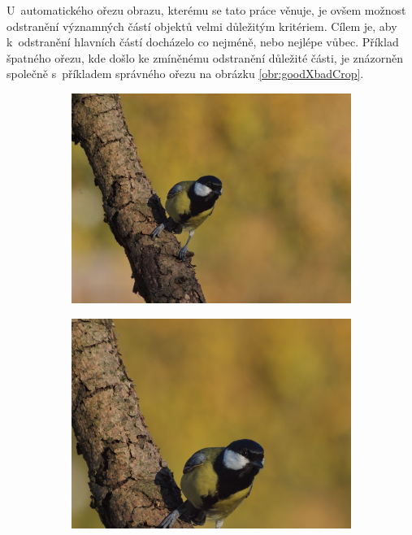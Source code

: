 U~automatického ořezu obrazu, kterému se tato práce věnuje, je ovšem možnost odstranění významných částí objektů velmi důležitým kritériem. Cílem je, aby k~odstranění hlavních částí docházelo co nejméně, nebo nejlépe vůbec. Příklad špatného ořezu, kde došlo ke zmíněnému odstranění důležité části, je znázorněn společně s~příkladem správného ořezu na obrázku \ref{obr:goodXbadCrop}.

\begin{figure}[H]
    \centering
    \begin{subfigure}{0.32\textwidth}
      \centering
      \includegraphics[scale=1.0]{obrazky/sykora.jpg}
      \caption{}
    \end{subfigure}
    \begin{subfigure}{0.32\textwidth}
      \centering
      \includegraphics[scale=1.0]{obrazky/sykora-bad.jpg}

\end{subfigure}
\end{figure}
